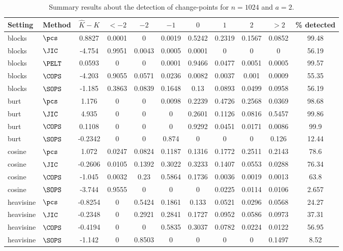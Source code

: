 \begin{table}[ht]
\centering
\begin{tabular}{llccccccccc}
  \hline
Setting & Method & $\hat{K} - K$ & $< -2$ & $-2$ & $-1$ & $0$ & $1$ & $2$ & $> 2$ & \% detected \\ 
  \hline
blocks & $\pcs$ & 0.8827 & 0.0001 &     0 & 0.0019 & 0.5242 & 0.2319 & 0.1567 & 0.0852 & 99.48 \\ 
  blocks & $\JIC$ & -4.754 & 0.9951 & 0.0043 & 0.0005 & 0.0001 &     0 &     0 &     0 & 56.19 \\ 
  blocks & $\PELT$ & 0.0593 &     0 &     0 & 0.0001 & 0.9466 & 0.0477 & 0.0051 & 0.0005 & 99.57 \\ 
  blocks & $\COPS$ & -4.203 & 0.9055 & 0.0571 & 0.0236 & 0.0082 & 0.0037 & 0.001 & 0.0009 & 55.35 \\ 
   \hline
blocks & $\SOPS$ & -1.185 & 0.3863 & 0.0839 & 0.1648 &  0.13 & 0.0893 & 0.0499 & 0.0958 & 56.19 \\ 
  burt & $\pcs$ & 1.176 &     0 &     0 & 0.0098 & 0.2239 & 0.4726 & 0.2568 & 0.0369 & 98.68 \\ 
   \hline
burt & $\JIC$ & 4.935 &     0 &     0 &     0 & 0.2601 & 0.1126 & 0.0816 & 0.5457 & 99.86 \\ 
  burt & $\COPS$ & 0.1108 &     0 &     0 &     0 & 0.9292 & 0.0451 & 0.0171 & 0.0086 &  99.9 \\ 
   \hline
burt & $\SOPS$ & -0.2342 &     0 &     0 & 0.874 &     0 &     0 &     0 & 0.126 & 12.44 \\ 
  cosine & $\pcs$ & 1.072 & 0.0247 & 0.0824 & 0.1187 & 0.1316 & 0.1772 & 0.2511 & 0.2143 &  78.6 \\ 
   \hline
cosine & $\JIC$ & -0.2606 & 0.0105 & 0.1392 & 0.3022 & 0.3233 & 0.1407 & 0.0553 & 0.0288 & 76.34 \\ 
  cosine & $\COPS$ & -1.045 & 0.0032 &  0.23 & 0.5864 & 0.1736 & 0.0036 & 0.0019 & 0.0013 &  63.8 \\ 
  cosine & $\SOPS$ & -3.744 & 0.9555 &     0 &     0 &     0 & 0.0225 & 0.0114 & 0.0106 & 2.657 \\ 
  heavisine & $\pcs$ & -0.8254 &     0 & 0.5424 & 0.1861 & 0.133 & 0.0521 & 0.0296 & 0.0568 & 24.27 \\ 
  heavisine & $\JIC$ & -0.2348 &     0 & 0.2921 & 0.2841 & 0.1727 & 0.0952 & 0.0586 & 0.0973 & 37.31 \\ 
  heavisine & $\COPS$ & -0.4194 &     0 &     0 & 0.5835 & 0.3037 & 0.0782 & 0.0224 & 0.0122 & 56.95 \\ 
  heavisine & $\SOPS$ & -1.142 &     0 & 0.8503 &     0 &     0 &     0 &     0 & 0.1497 &  8.52 \\ 
  \end{tabular}
\caption{Summary results about the detection of change-points for $n = 1024$ and $a = 2$.} 
\label{tab:CPn1024a2}
\end{table}
